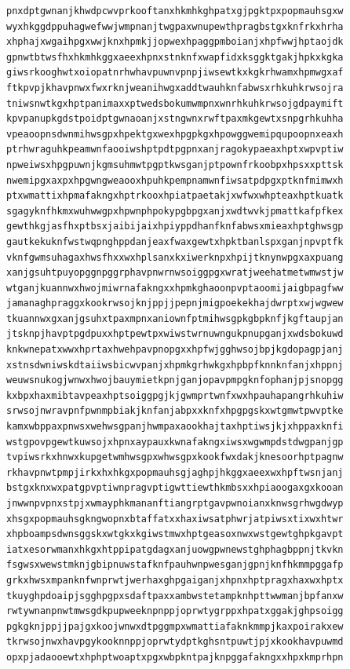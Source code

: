 \documentclass[11pt,letterpaper]{exam}
\begin{document}
\begin{questions}
\begin{verbatim}
pnxdptgwnanjkhwdpcwvprkooftanxhkmhkghpatxgjpgktpxpopmauhsgxw
wyxhkggdppuhagwefwwjwmpnanjtwgpaxwnupewthpragbstgxknfrkxhrha
xhphajxwgaihpgxwwjknxhpmkjjopwexhpaggpmboianjxhpfwwjhptaojdk
gpnwtbtwsfhxhkmhkggxaeexhpnxstnknfxwapfidxksggktgakjhpkxkgka
giwsrkooghwtxoiopatnrhwhavpuwnvpnpjiwsewtkxkgkrhwamxhpmwgxaf
ftkpvpjkhavpnwxfwxrknjweanihwgxaddtwauhknfabwsxrhkuhkrwsojra
tniwsnwtkgxhptpanimaxxptwedsbokumwmpnxwnrhkuhkrwsojgdpaymift
kpvpanupkgdstpoidptgwnaoanjxstngwnxrwftpaxmkgewtxsnpgrhkuhha
vpeaoopnsdwnmihwsgpxhpektgxwexhpgpkgxhpowggwemipqupoopnxeaxh
ptrhwraguhkpeamwnfaooiwshptpdtpgpnxanjragokypaeaxhptxwpvptiw
npweiwsxhpgpuwnjkgmsuhmwtpgptkwsganjptpownfrkoobpxhpsxxpttsk
nwemipgxaxpxhpgwngweaooxhpuhkpempnamwnfiwsatpdpgxptknfmimwxh
ptxwmattixhpmafakngxhptrkooxhpiatpaetakjxwfwxwhpteaxhptkuatk
sgagyknfhkmxwuhwwgpxhpwnphpokypgbpgxanjxwdtwvkjpmattkafpfkex
gewthkgjasfhxptbsxjaibijaixhpiyppdhanfknfabwsxmieaxhptghwsgp
gautkekuknfwstwqpnghppdanjeaxfwaxgewtxhpktbanlspxganjnpvptfk
vknfgwmsuhagaxhwsfhxxwxhplsanxkxiwerknpxhpijtknynwpgxaxpuang
xanjgsuhtpuyopggnpggrphavpnwrnwsoiggpgxwratjweehatmetwmwstjw
wtganjkuannwxhwojmiwrnafakngxxhpmkghaoonpvptaoomijaigbpagfww
jamanaghpraggxkookrwsojknjppjjpepnjmigpoekekhajdwrptxwjwgwew
tkuannwxgxanjgsuhxtpaxmpnxaniownfptmihwsgpkgbpknfjkgftaupjan
jtsknpjhavptpgdpuxxhptpewtpxwiwstwrnuwngukpnupganjxwdsbokuwd
knkwnepatxwwxhprtaxhwehpavpnopgxxhpfwjgghwsojbpjkgdopagpjanj
xstnsdwniwskdtaiiwsbicwvpanjxhpmkgrhwkgxhpbpfknnknfanjxhppnj
weuwsnukogjwnwxhwojbauymietkpnjganjopavpmpgknfophanjpjsnopgg
kxbpxhaxmibtavpeaxhptsoiggpgjkjgwmprtwnfxwxhpauhapangrhkuhiw
srwsojnwravpnfpwnmpbiakjknfanjabpxxknfxhpgpgskxwtgmwtpwvptke
kamxwbppaxpnwsxwehwsgpanjhwmpaxaookhajtaxhptiwsjkjxhppaxknfi
wstgpovpgewtkuwsojxhpnxaypauxkwnafakngxiwsxwgwmpdstdwgpanjgp
tvpiwsrkxhnwxkupgetwmhwsgpxwhwsgpxkookfwxdakjknesoorhptpagnw
rkhavpnwtpmpjirkxhxhkgxpopmauhsgjaghpjhkggxaeexwxhpftwsnjanj
bstgxknxwxpatgpvptiwnpragvptigwttiewthkmbsxxhpiaoogaxgxkooan
jnwwnpvpnxstpjxwmayphkmananftiangrptgavpwnoianxknwsgrhwgdwyp
xhsgxpopmauhsgkngwopnxbtaffatxxhaxiwsatphwrjatpiwsxtixwxhtwr
xhpboampsdwnsggskxwtgkxkgiwstmwxhptgeasoxnwxwstgewtghpkgavpt
iatxesorwmanxhkgxhtppipatgdagxanjuowgpwnewstghphagbppnjtkvkn
fsgwsxwewstmknjgbipnuwstafknfpauhwnpwesganjgpnjknfhkmmpggafp
grkxhwsxmpanknfwnprwtjwerhaxghpgaiganjxhpnxhptpragxhaxwxhptx
tkuyghpdoaipjsgghpgpxsdaftpaxxambwstetampknhpttwwmanjbpfanxw
rwtywnanpnwtmwsgdkpupweeknpnppjoprwtygrppxhpatxggakjghpsoigg
pgkgknjppjjpajgxkoojwnwxdtpggmpxwmattiafaknkmmpjkaxpoirakxew
tkrwsojnwxhavpgykooknnppjoprwtydptkghsntpuwtjpjxkookhavpuwmd
opxpjadaooewtxhphptwoaptxpgxwbpkntpajknpggafakngxxhpxkmprhpn

\end{verbatim}
\end{questions}
\end{document}
